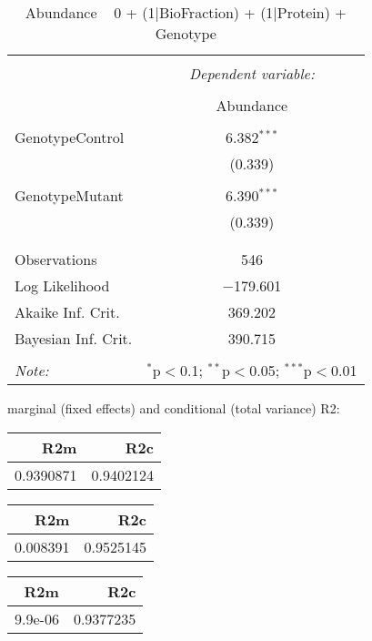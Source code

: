 \documentclass[11pt]{report}
\begin{document}
\begin{table}[!htbp] \centering 
  \caption{Abundance ~ 0 + (1|BioFraction) + (1|Protein) + Genotype} 
  \label{} 
\begin{tabular}{@{\extracolsep{5pt}}lc} 
\\[-1.8ex]\hline 
\hline \\[-1.8ex] 
 & \multicolumn{1}{c}{\textit{Dependent variable:}} \\ 
\cline{2-2} 
\\[-1.8ex] & Abundance \\ 
\hline \\[-1.8ex] 
 GenotypeControl & 6.382$^{***}$ \\ 
  & (0.339) \\ 
  & \\ 
 GenotypeMutant & 6.390$^{***}$ \\ 
  & (0.339) \\ 
  & \\ 
\hline \\[-1.8ex] 
Observations & 546 \\ 
Log Likelihood & $-$179.601 \\ 
Akaike Inf. Crit. & 369.202 \\ 
Bayesian Inf. Crit. & 390.715 \\ 
\hline 
\hline \\[-1.8ex] 
\textit{Note:}  & \multicolumn{1}{r}{$^{*}$p$<$0.1; $^{**}$p$<$0.05; $^{***}$p$<$0.01} \\ 
\end{tabular} 
\end{table} 
marginal (fixed effects) and conditional (total variance) R2:

\begin{tabular}{r|r}
\hline
R2m & R2c\\
\hline
0.9390871 & 0.9402124\\
\hline
\end{tabular}

\begin{tabular}{r|r}
\hline
R2m & R2c\\
\hline
0.008391 & 0.9525145\\
\hline
\end{tabular}

\begin{tabular}{r|r}
\hline
R2m & R2c\\
\hline
9.9e-06 & 0.9377235\\
\hline
\end{tabular}
\end{document}
